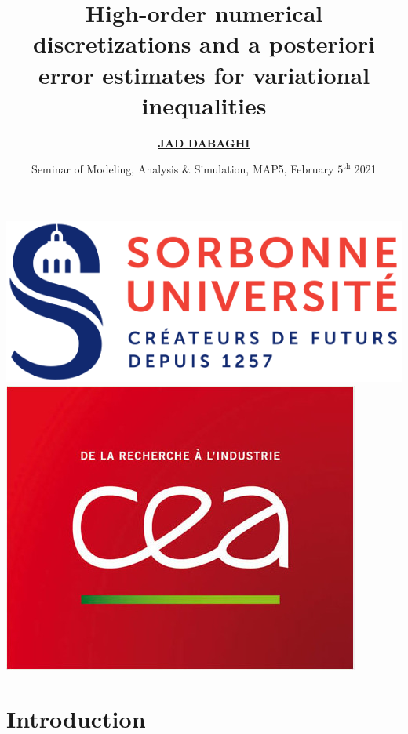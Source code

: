 \documentclass[aspectratio=169]{beamer}
\title{High-order numerical
discretizations and a posteriori error estimates for variational inequalities}
\author{\underline{\textbf{JAD DABAGHI}}}
\institute[]{Sorbonne Université (LJLL) \& CEA Paris Saclay }
\date{Seminar of Modeling, Analysis $\&$ Simulation, MAP5, February $5^{\mathrm{th}}$ 2021}
\begin{document}



\begin{frame}
\maketitle
\includegraphics[scale=0.2]{logo_sorbonne}
\hfill 
\includegraphics[scale=0.13]{CEA}

\end{frame}



\section{Introduction}
\end{document}

